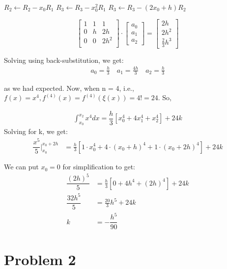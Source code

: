 \documentclass[12pt,letterpaper]{article}
\begin{document}
$R_2 \leftarrow R_2 - x_0 R_1$ \qquad
$R_3 \leftarrow R_3 - x_0^2 R_1$\qquad
$R_3 \leftarrow R_3 - (2x_0 + h) R_2$

\begin{equation}
\begin{bmatrix}
       1 		& 		1	 		&  	1 \\
       0	 	& 		h 			& 	2h \\
       0	 	& 		0	 		& 	2h^2 \\
\end{bmatrix}
     \cdot
\begin{bmatrix}
       a_{0} \\
       a_{1} \\
       a_{2}
\end{bmatrix}
     =
\begin{bmatrix}
       2h \\
       2h^2\\
       \frac{2}{3} h^3
\end{bmatrix}
\end{equation}


Solving using back-substitution, we get:
\begin{align*}
a_0 = \frac{h}{3} \quad
a_1 = \frac{4h}{3} \quad
a_2 = \frac{h}{3}
\end{align*}

as we had expected.
Now, when n = 4, i.e., $f(x) = x^4 , f^{(4)}(x) = f^{(4)}(\xi(x)) = 4! = 24$. So,

\begin{align}
\int_{x_0}^{x_2} x^4 dx = \dfrac{h}{3} [x_0^4 + 4 x_1^4 + x_2^4] + 24k
\end{align}
Solving for k, we get:
\begin{align}
\dfrac{x^5}{5} \Biggr|_{x_0}^{x_0 + 2h} &= \frac{h}{3}[1 \cdot x_0^4 + 4 \cdot (x_0 + h)^4 + 1 \cdot (x_0 + 2h)^4] + 24k
\end{align}

We can put $x_0 = 0$ for simplification to get:
\begin{align*}
\dfrac{(2h)^5}{5} &= \frac{h}{3}[0 + 4h^4 + (2h)^4] + 24k\\
\dfrac{32h^5}{5} &= \frac{20}{3}h^5 + 24k\\
k &= -\dfrac{h^5}{90}
\end{align*}





\newpage

\section*{Problem 2}
\end{document}
